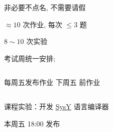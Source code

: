\begin{frame}{}
  \begin{columns}
  \end{columns}
\end{frame}

\begin{frame}{}
  \begin{columns}
      \begin{description}[<+->]
        \setlength{\itemsep}{25pt}
        \item[\blue{\bf 考勤 ($0\%$):}] 非必要不点名, 不需要请假
        \item[\cyan{\bf 平时作业 ($0\%$):}] $\approx 10$ 次作业, 每次 $\le 3$ 题
        \item[\red{\bf 课程实验 ($60\%$):}] $8 \sim 10$ 次实验
        \item[\red{\bf 期末测试 ($40\%$):}] 考试周统一安排; 
      \end{description}
  \end{columns}
\end{frame}

\begin{frame}{}
  \begin{center}
    每周五发布作业 \qquad 下周五  前作业
  \end{center}

  \begin{columns}
    \vspace{-0.80cm}
    \begin{center}
    \end{center}
  \end{columns}
\end{frame}

\begin{frame}{}
  \begin{center}
    课程实验：开发 \href{https://compiler.educg.net/}{\textsf{SysY}} 语言编译器


    \vspace{0.30cm}
      本周五 18:00 发布
  \end{center}
\end{frame}

